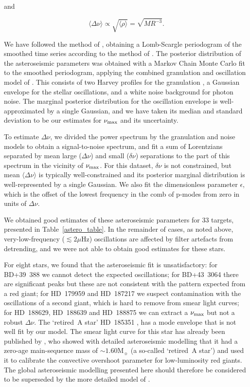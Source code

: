 \documentclass[modern]{aastex62}
\newcommand{\numax}{\mbox{$\nu_{\rm max}$}\xspace}
\newcommand{\Dnu}{\mbox{$\Delta \nu$}\xspace}
\newcommand{\dnu}{\mbox{$\delta \nu$}\xspace}
\newcommand{\muHz}{\mbox{$\mu$Hz}\xspace}
\newcommand{\msun}{\mbox{$\mathrm{M}_{\sun}$}\xspace}
\begin{document}
and

\begin{equation}
\label{Dnuscaling}
\langle \Dnu \rangle \propto \sqrt{\langle \rho \rangle} = \sqrt{M {R}^{-3}}.
\end{equation}

We have followed the method of \citet{2016AN....337..774D}, obtaining a Lomb-Scargle periodogram of the smoothed time series according to the method of \citet{2011MNRAS.414L...6G}. The posterior distribution of the asteroseismic parameters was obtained with a Markov Chain Monte Carlo fit to the smoothed periodogram, applying the combined granulation and oscillation model of \citet{2014A&A...570A..41K}. This consists of two Harvey profiles for the granulation \citep{1985ESASP.235..199H}, a Gaussian envelope for the stellar oscillations, and a white noise background for photon noise. The marginal posterior distribution for the oscillation envelope is well-approximated by a single Gaussian, and we have taken its median and standard deviation to be our estimates for \numax and its uncertainty.

To estimate \Dnu, we divided the power spectrum by the granulation and noise models to obtain a signal-to-noise spectrum, and fit a sum of Lorentzians separated by mean large (\Dnu) and small (\dnu) separations to the part of this spectrum in the vicinity of \numax. For this dataset, \dnu is not constrained, but mean $\langle \Dnu \rangle$ is typically well-constrained and its posterior marginal distribution is well-represented by a single Gaussian. We also fit the dimensionless parameter $\epsilon$, which is the offset of the lowest frequency in the comb of p-modes from zero in units of $\Dnu$.

We obtained good estimates of these asteroseismic parameters for 33 targets, presented in Table~\ref{astero_table}. In the remainder of cases, as noted above, very-low-frequency ($\lesssim 2\muHz$) oscillations are affected by filter artefacts from detrending, and we were not able to obtain good estimates for these stars. 

For eight stars, we found that the asteroseismic fit is unsatisfactory: for BD+39~388 we cannot detect the expected oscillations; for BD+43~3064 there are significant peaks but these are not consistent with the pattern expected from a red giant; for HD~179959 and HD~187217 we suspect contamination with the oscillations of a second giant, which is hard to remove from smear light curves; for HD~188629, HD~188639 and HD~188875 we can extract a \numax but not a robust \Dnu. The `retired~A star' HD~185351 \citep[studied by][]{2014ApJ...794...15J}, has a mode envelope that is not well fit by our model. The smear light curve for this star has already been published by \citet{2017MNRAS.464.3713H}, who showed with detailed asteroseismic modelling that it had a zero-age main-sequence mass of $\sim 1.60 \msun$ (a so-called `retired~A star') and used it to calibrate the convective overshoot parameter for low-luminosity red giants. The global asteroseismic modelling presented here should therefore be considered to be superseded by the more detailed model of \citet{2017MNRAS.464.3713H}. 
\end{document}
